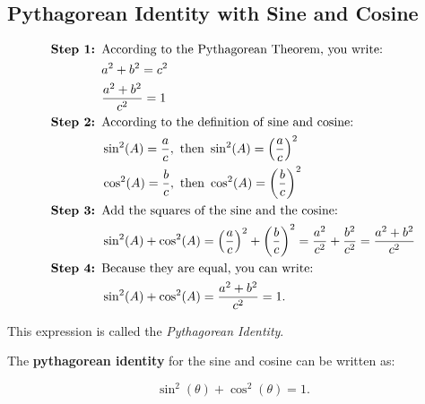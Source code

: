 
\subsection{Pythagorean Identity with Sine and Cosine}
\label{sub_sec:pythagorean_identity_with_sine_and_cosine}

\begin{align*}
  \textrm{\textbf{Step 1: }}&\textrm{According to the Pythagorean Theorem, you write:} \\
   &a^{2} + b^{2} = c^{2} \\
   &\frac{a^{2} + b^{2}}{c^{2}} = 1 \\
  \textrm{\textbf{Step 2: }}&\textrm{According to the definition of sine and cosine:} \\
   &\sin^{2}(A) = \frac{a}{c}, \textrm{ then } \sin^{2}(A) = \left(\frac{a}{c}\right)^{2} \\
   &\cos^{2}(A) = \frac{b}{c}, \textrm{ then } \cos^{2}(A) = \left(\frac{b}{c}\right)^{2} \\
  \textrm{\textbf{Step 3: }}&\textrm{Add the squares of the sine and the cosine:} \\
   &\sin^{2}(A) + \cos^{2}(A) = \left(\frac{a}{c}\right)^{2} + \left(\frac{b}{c}\right)^{2} = \frac{a^{2}}{c^{2}} + \frac{b^{2}}{c^{2}} = \frac{a^{2} + b^{2}}{c^{2}} \\
  \textrm{\textbf{Step 4: }}&\textrm{Because they are equal, you can write:} \\
   &\sin^{2}(A) + \cos^{2}(A) = \frac{a^{2} + b^{2}}{c^{2}} = 1
.\end{align*}

This expression is called the \textit{Pythagorean Identity}.

\begin{intuition}
  \label{int:pythagorean_identity}

  The \textbf{pythagorean identity} for the sine and cosine can be written as:

  \[ \sin^{2}(\theta) + \cos^{2}(\theta) = 1 . \]
\end{intuition}




\newpage
